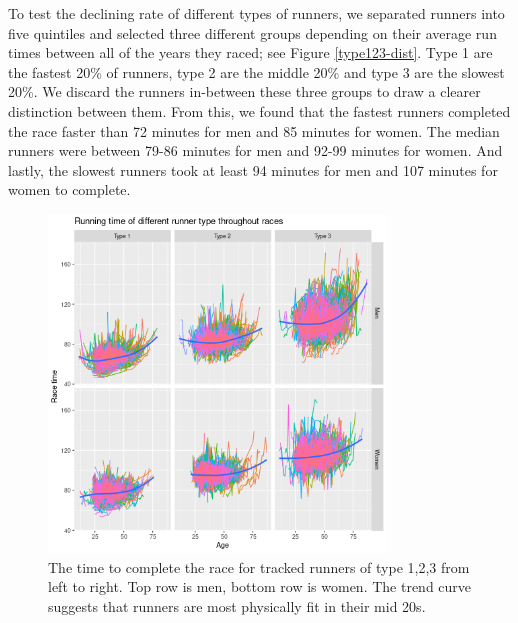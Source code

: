 \documentclass[12pt]{article}
\begin{document}


To test the declining rate of different types of runners,
we separated runners into five quintiles and selected three different
groups depending on their average run times between all of the years they
raced; see Figure \ref{type123-dist}.
Type 1 are the fastest 20\% of runners, type 2 are the middle 20\% and
type 3 are the slowest 20\%.
We discard the runners in-between these three groups to draw a clearer
distinction between them.
From this, we found that the fastest runners completed the race faster
than 72 minutes for men and 85 minutes for women.
The median runners were between 79-86 minutes for men and 92-99 minutes
for women.
And lastly, the slowest runners took at least 94 minutes for men and
107 minutes for women to complete.

\begin{figure}[ht]
	\centering
	\includegraphics[width = 0.8\textwidth]
	{../figure/run_type2_gr-1.png}
	\caption{
		The time to complete the race for tracked runners of
		type 1,2,3 from left to right. Top row is men,
		bottom row is women.
		The trend curve suggests that runners are most physically
		fit in their mid 20s.
	}
	\label{type123-trend}
\end{figure}
\end{document}
